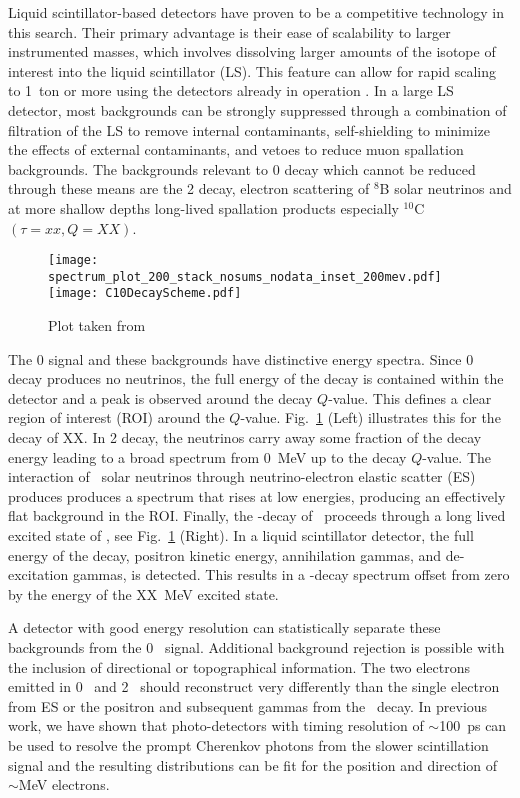 Liquid scintillator-based detectors have
proven to be a competitive technology in this search\cite{KamLANDZen2013}. Their primary advantage is their ease of scalability to
larger instrumented masses, which involves dissolving larger amounts of
the isotope of interest into the liquid scintillator (LS). This
feature can allow for rapid scaling to 1~ton or more using the
detectors already in operation \cite{Biller2013}. In a large LS
detector, most backgrounds can be strongly suppressed through a
combination of filtration of the LS to remove internal contaminants,
self-shielding to minimize the effects of external contaminants, and
vetoes to reduce muon spallation backgrounds. The backgrounds relevant to
0{\nbb} decay which cannot be reduced through these means are the
2{\nbb} decay, electron scattering of $^8$B solar neutrinos and at more shallow depths long-lived spallation products especially $^{10}$C$(\tau=xx, Q=XX)$.

\begin{figure}[ht]
\centering
\texttt{[image: spectrum\_plot\_200\_stack\_nosums\_nodata\_inset\_200mev.pdf]}
\texttt{[image: C10DecayScheme.pdf]}
\caption{ Plot taken from~\cite{SNOp_paper}}
\label{fig:EdisAnd10C}
\end{figure}


The 0{\nbb} signal and these backgrounds have distinctive energy spectra. Since 0{\nbb} decay produces no neutrinos, the full energy of the
decay is contained within the detector and a peak is observed around the decay $Q$-value. This defines a clear region of interest (ROI) around the $Q$-value.  Fig.~\ref{fig:EdisAnd10C} (Left) illustrates this for the \nbb decay of XX. In 2{\nbb} decay, the neutrinos carry away some fraction of the decay energy leading to a broad spectrum from 0~MeV up to the decay $Q$-value. The interaction of \B~solar neutrinos through neutrino-electron elastic scatter (ES) produces produces a spectrum that rises at low energies, producing an effectively flat background in the ROI. Finally, the \bpd-decay of \C~proceeds through a long lived excited state of \Bten,  see Fig.~\ref{fig:EdisAnd10C} (Right). In a liquid scintillator detector, the full energy of the decay, positron kinetic energy, annihilation gammas, and de-excitation gammas, is detected. This results in a \bmd-decay spectrum offset from zero by the energy of the XX~MeV excited state.

A detector with good energy resolution can statistically separate these backgrounds from the 0\nbb~ signal. Additional background rejection is possible with the inclusion of directional or topographical information. The two electrons emitted in 0\nbb~ and 2\nbb~ should reconstruct very differently than the single electron from ES or the positron and subsequent  gammas from the \C~decay. In previous work, we have shown that photo-detectors with timing resolution of $\sim$100~ps can be used to resolve the prompt Cherenkov photons from the slower scintillation signal and the resulting distributions can be fit for the position and direction of $\sim$MeV electrons\cite{Aberle2014}. 

